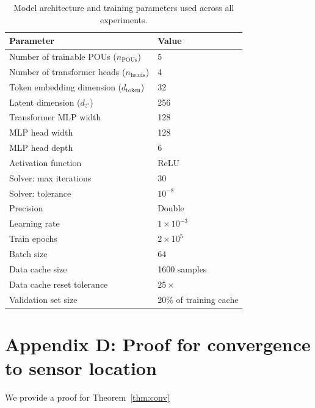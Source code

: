 \documentclass[onefignum,onetabnum]{siamart171218} %
\begin{document}
\begin{table}[ht!]
    \centering
    \caption{Model architecture and training parameters used across all experiments.}
    \begin{tabular}{ll}
        \toprule
        \textbf{Parameter} & \textbf{Value} \\
        \midrule
        Number of trainable POUs ($n_{\text{POUs}}$) & 5 \\ %
        Number of transformer heads ($n_{\text{heads}}$) & 4 \\
        Token embedding dimension ($d_{\text{token}}$) & 32 \\
        Latent dimension ($d_{z'}$) & 256 \\
        Transformer MLP width & 128 \\
        MLP head width & 128 \\
        MLP head depth & 6 \\
        Activation function & ReLU \\
        Solver: max iterations & 30 \\
        Solver: tolerance & $10^{-8}$ \\
        Precision & Double \\
        \midrule
        Learning rate & $1 \times 10^{-3}$ \\
        Train epochs & $2 \times 10^{5}$ \\
        Batch size & $64$ \\
        Data cache size & 1600 samples \\
        Data cache reset tolerance & $25 \times$ \\
        Validation set size & 20\% of training cache \\
        \bottomrule
    \end{tabular}
    \label{tab:model-params}
\end{table}

\section{Appendix D: Proof for 
convergence to sensor location}
\label{app:conv_proof}

We provide a proof for Theorem~\ref{thm:conv}
\end{document}

